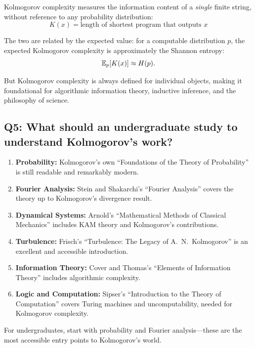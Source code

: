 Kolmogorov complexity measures the information content of a \textit{single} finite string, without reference to any probability distribution:
\[
K(x) = \text{length of shortest program that outputs } x
\]

The two are related by the expected value: for a computable distribution $p$, the expected Kolmogorov complexity is approximately the Shannon entropy:
\[
\operatorname{\mathbb{E}}_p[K(x)] \approx H(p).
\]

But Kolmogorov complexity is always defined for individual objects, making it foundational for algorithmic information theory, inductive inference, and the philosophy of science.

\subsection*{Q5: What should an undergraduate study to understand Kolmogorov's work?}

\begin{enumerate}
    \item \textbf{Probability:} Kolmogorov's own ``Foundations of the Theory of Probability'' is still readable and remarkably modern.
    \item \textbf{Fourier Analysis:} Stein and Shakarchi's ``Fourier Analysis'' covers the theory up to Kolmogorov's divergence result.
    \item \textbf{Dynamical Systems:} Arnold's ``Mathematical Methods of Classical Mechanics'' includes KAM theory and Kolmogorov's contributions.
    \item \textbf{Turbulence:} Frisch's ``Turbulence: The Legacy of A.\ N.\ Kolmogorov'' is an excellent and accessible introduction.
    \item \textbf{Information Theory:} Cover and Thomas's ``Elements of Information Theory'' includes algorithmic complexity.
    \item \textbf{Logic and Computation:} Sipser's ``Introduction to the Theory of Computation'' covers Turing machines and uncomputability, needed for Kolmogorov complexity.
\end{enumerate}

For undergraduates, start with probability and Fourier analysis—these are the most accessible entry points to Kolmogorov's world.


